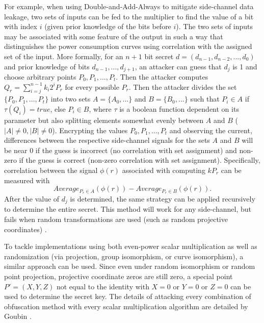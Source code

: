 \documentclass{article}
\begin{document}
    For example, when using Double-and-Add-Always to mitigate side-channel data
    leakage, two sets of inputs can be fed to the multiplier to find the value
    of a bit with index $i$ (given prior knowledge of the bits before $i$).
    The two sets of inputs may be associated with some feature of the output in
    such a way that distinguishes the power consumption curves using
    correlation with the assigned set of the input. More formally, for an $n+1$
    bit secret $d = (d_{n-1}, d_{n-2}, ..., d_0)$ and prior knowledge of bits
    $d_{n-1}, ..., d_{j+1}$, an attacker can guess that $d_j$ is 1
    and choose arbitrary points
    $P_0, P_1, ..., P_t$. Then the attacker computes
    $Q_r = \sum_{i=j}^{n-1} k_i2^{i}P_r$
    for every possible $P_r$.
    Then the attacker divides the set $\{P_0, P_1, ..., P_t\}$ into two sets
    $A = \{A_0, ...\}$ and $B = \{B_0, ...\}$ such that
    $P_i \in A$ if $\tau(Q_i) = true$, else $P_i \in B$, where $\tau$ is a
    boolean function dependent on its parameter but also splitting elements
    somewhat evenly between $A$ and $B$ ($|A| \neq 0, |B| \neq 0$).  Encrypting
    the values $P_0, P_1, ..., P_t$ and observing the current, differences
    between the respective side-channel signals for the sets $A$ and $B$ will
    be near 0 if the guess is incorrect (no correlation with set assignment)
    and non-zero if the guess is correct (non-zero correlation with set
    assignment).  Specifically, correlation between the signal $\phi(r)$
    associated with computing $kP_r$ can be measured with
    \begin{equation}
        Average_{P_r \in A}(\phi(r)) - Average_{P_r \in B}(\phi(r)).
    \end{equation}
    After the value of $d_j$ is determined, the same strategy can be applied
    recursively to determine the entire secret. This method will work for any
    side-channel, but fails when random transformations are used (such as
    random projective coordinates) \cite{joye2003elliptic}.
   
    To tackle implementations using both even-power scalar multiplication as
    well as randomization (via projection, group isomorphism, or curve
    isomorphism), a similar approach can be used. Since even under random
    isomorphism or random point projection, projective coordinate zeros are
    still zero, a special point $P' = (X, Y, Z)$ not equal to the identity with
    $X=0$ or $Y=0$ or $Z=0$ can be used to determine the secret key. The
    details of attacking every combination of obfuscation method with every
    scalar multiplication algorithm are detailed by Goubin
    \cite{goubin2003refined}.
    
\end{document}
